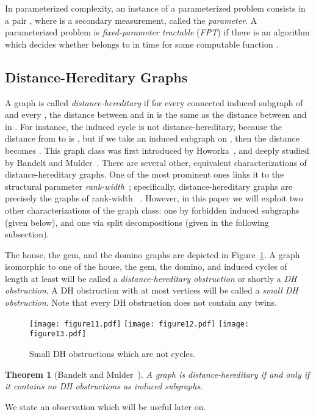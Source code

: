 \documentclass[11pt]{elsarticle}
\newtheorem{theorem}{Theorem}[section]
\begin{document}
In parameterized complexity, an instance of a parameterized problem consists in a pair , where  is a secondary measurement, called the \emph{parameter}. 
A parameterized problem  is \emph{fixed-parameter tractable} (\emph{FPT}) if there is an algorithm which decides whether  belongs to  in time  for some computable function . 


\subsection{Distance-Hereditary Graphs}
A graph  is called \emph{distance-hereditary} if for every connected induced subgraph  of  and every , 
the distance between  and  in  is the same as the distance between  and  in . 
For instance, the induced cycle  is not distance-hereditary, because the distance from  to  is , 
but if we take an induced subgraph on , then the distance becomes .
This graph class was first introduced by Howorka~\cite{howorka77}, and deeply studied by Bandelt and Mulder~\cite{BM1986}.
There are several other, equivalent characterizations of distance-hereditary graphs. One of the most prominent ones links it to the structural parameter \emph{rank-width}~\cite{Oum05}; specifically, distance-hereditary graphs are precisely the graphs of rank-width ~\cite{Oum05}.
However, in this paper we will exploit two other characterizations of the graph class: one by forbidden induced subgraphs (given below), and one via split decompositions (given in the following subsection).

The house, the gem, and the domino graphs are depicted in Figure~\ref{fig:obsdh}.
A graph isomorphic to one of the house, the gem, the domino, and induced cycles of length at least  will be called a \emph{distance-hereditary obstruction} or shortly a \emph{DH obstruction}.
A DH obstruction with at most  vertices will be called a \emph{small DH obstruction}.
Note that every DH obstruction does not contain any twins.

\begin{figure}[t]
\centerline{\texttt{[image: figure11.pdf]} \quad\quad
\texttt{[image: figure12.pdf]} \quad\quad
\texttt{[image: figure13.pdf]} }
\caption{Small DH obstructions which are not cycles.}
\label{fig:obsdh}
\end{figure}

\begin{theorem}[Bandelt and Mulder~\cite{BM1986}]
A graph is distance-hereditary if and only if it contains no DH obstructions as induced subgraphs.
\end{theorem}
We state an observation which will be useful later on.
\end{document}
